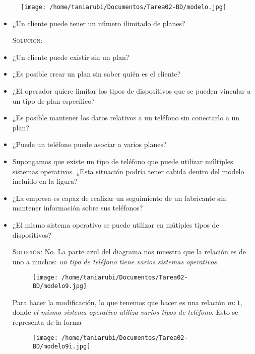 \documentclass[letterpaper,11pt]{article}
\begin{document}
\begin{figure}[h]
    \centering
    \texttt{[image: /home/taniarubi/Documentos/Tarea02-BD/modelo.jpg]}
\end{figure}

\begin{itemize}
    \item ¿Un cliente puede tener un número ilimitado de planes?

    \textsc{Solución: }
    \item ¿Un cliente puede existir sin un plan?
    \item ¿Es posible crear un plan sin saber quién es el cliente?
    \item ¿El operador quiere limitar los tipos de dispositivos que se pueden 
    vincular a un tipo de plan específico?
    \item ¿Es posible mantener los datos relativos a un teléfono sin conectarlo
    a un plan?
    \item ¿Puede un teléfono puede asociar a varios planes?
    \item Supongamos que existe un tipo de teléfono que puede utilizar múltiples
    sistemas operativos. ¿Esta situación podría tener cabida dentro del modelo 
    incluido en la figura?
    \item ¿La empresa es capaz de realizar un seguimiento de un fabricante sin 
    mantener información sobre sus teléfonos?
    \item ¿El mismo sistema operativo se puede utilizar en mútiples tipos de  
    dispositivos? 

    \textsc{Solución:} No. La parte azul del diagrama nos muestra que la 
    relación es de uno a muchos: \textit{un tipo de teléfono tiene varios 
    sistemas operativos.} 

    \begin{figure}[h]
        \centering
        \texttt{[image: /home/taniarubi/Documentos/Tarea02-BD/modelo9.jpg]}
    \end{figure}

    Para hacer la modificación, lo que tenemos que hacer es una relación $m:1$, 
    donde \textit{el mismo sistema operativo utiliza varios tipos de teléfono}.
    Esto se representa de la forma

    \begin{figure}[h]
        \centering
        \texttt{[image: /home/taniarubi/Documentos/Tarea02-BD/modelo9i.jpg]}
    \end{figure}


\end{itemize}
\end{document}
